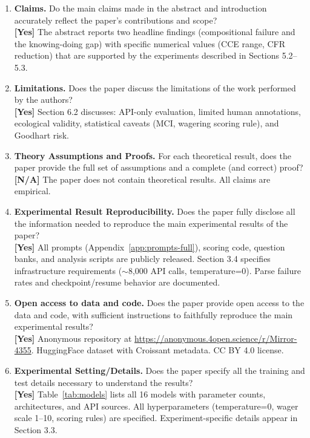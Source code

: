 \documentclass[10pt]{article}
\begin{document}
\begin{enumerate}

\item \textbf{Claims.} Do the main claims made in the abstract and introduction accurately reflect the paper's contributions and scope?
\\\textbf{[Yes]} The abstract reports two headline findings (compositional failure and the knowing-doing gap) with specific numerical values (CCE range, CFR reduction) that are supported by the experiments described in Sections 5.2--5.3.

\item \textbf{Limitations.} Does the paper discuss the limitations of the work performed by the authors?
\\\textbf{[Yes]} Section 6.2 discusses: API-only evaluation, limited human annotations, ecological validity, statistical caveats (MCI, wagering scoring rule), and Goodhart risk.

\item \textbf{Theory Assumptions and Proofs.} For each theoretical result, does the paper provide the full set of assumptions and a complete (and correct) proof?
\\\textbf{[N/A]} The paper does not contain theoretical results. All claims are empirical.

\item \textbf{Experimental Result Reproducibility.} Does the paper fully disclose all the information needed to reproduce the main experimental results of the paper?
\\\textbf{[Yes]} All prompts (Appendix~\ref{app:prompts-full}), scoring code, question banks, and analysis scripts are publicly released. Section 3.4 specifies infrastructure requirements ($\sim$8{,}000 API calls, temperature=0). Parse failure rates and checkpoint/resume behavior are documented.

\item \textbf{Open access to data and code.} Does the paper provide open access to the data and code, with sufficient instructions to faithfully reproduce the main experimental results?
\\\textbf{[Yes]} Anonymous repository at \url{https://anonymous.4open.science/r/Mirror-4355}. HuggingFace dataset with Croissant metadata. CC BY 4.0 license.

\item \textbf{Experimental Setting/Details.} Does the paper specify all the training and test details necessary to understand the results?
\\\textbf{[Yes]} Table~\ref{tab:models} lists all 16 models with parameter counts, architectures, and API sources. All hyperparameters (temperature=0, wager scale 1--10, scoring rules) are specified. Experiment-specific details appear in Section 3.3.


\end{enumerate}
\end{document}
